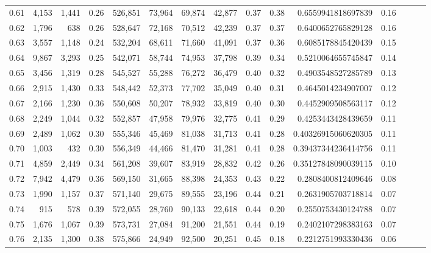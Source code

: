 \begin{tabular}{rrrrrrrrrrrrrrr}
0.61 &   4,153 &  1,441 &  0.26 &  526,851 &   73,964 &   69,874 &   42,877 &  0.37 &  0.38 &    0.6559941818697839 &      0.16 \\
0.62 &   1,796 &    638 &  0.26 &  528,647 &   72,168 &   70,512 &   42,239 &  0.37 &  0.37 &    0.6400652765829128 &      0.16 \\
0.63 &   3,557 &  1,148 &  0.24 &  532,204 &   68,611 &   71,660 &   41,091 &  0.37 &  0.36 &    0.6085178845420439 &      0.15 \\
0.64 &   9,867 &  3,293 &  0.25 &  542,071 &   58,744 &   74,953 &   37,798 &  0.39 &  0.34 &    0.5210064655745847 &      0.14 \\
0.65 &   3,456 &  1,319 &  0.28 &  545,527 &   55,288 &   76,272 &   36,479 &  0.40 &  0.32 &    0.4903548527285789 &      0.13 \\
0.66 &   2,915 &  1,430 &  0.33 &  548,442 &   52,373 &   77,702 &   35,049 &  0.40 &  0.31 &    0.4645014234907007 &      0.12 \\
0.67 &   2,166 &  1,230 &  0.36 &  550,608 &   50,207 &   78,932 &   33,819 &  0.40 &  0.30 &    0.4452909508563117 &      0.12 \\
0.68 &   2,249 &  1,044 &  0.32 &  552,857 &   47,958 &   79,976 &   32,775 &  0.41 &  0.29 &    0.4253443428439659 &      0.11 \\
0.69 &   2,489 &  1,062 &  0.30 &  555,346 &   45,469 &   81,038 &   31,713 &  0.41 &  0.28 &   0.40326915060620305 &      0.11 \\
0.70 &   1,003 &    432 &  0.30 &  556,349 &   44,466 &   81,470 &   31,281 &  0.41 &  0.28 &   0.39437344236414756 &      0.11 \\
0.71 &   4,859 &  2,449 &  0.34 &  561,208 &   39,607 &   83,919 &   28,832 &  0.42 &  0.26 &   0.35127848090039115 &      0.10 \\
0.72 &   7,942 &  4,479 &  0.36 &  569,150 &   31,665 &   88,398 &   24,353 &  0.43 &  0.22 &    0.2808400812409646 &      0.08 \\
0.73 &   1,990 &  1,157 &  0.37 &  571,140 &   29,675 &   89,555 &   23,196 &  0.44 &  0.21 &    0.2631905703718814 &      0.07 \\
0.74 &     915 &    578 &  0.39 &  572,055 &   28,760 &   90,133 &   22,618 &  0.44 &  0.20 &    0.2550753430124788 &      0.07 \\
0.75 &   1,676 &  1,067 &  0.39 &  573,731 &   27,084 &   91,200 &   21,551 &  0.44 &  0.19 &    0.2402107298383163 &      0.07 \\
0.76 &   2,135 &  1,300 &  0.38 &  575,866 &   24,949 &   92,500 &   20,251 &  0.45 &  0.18 &    0.2212751993330436 &      0.06 \\

\end{tabular}
